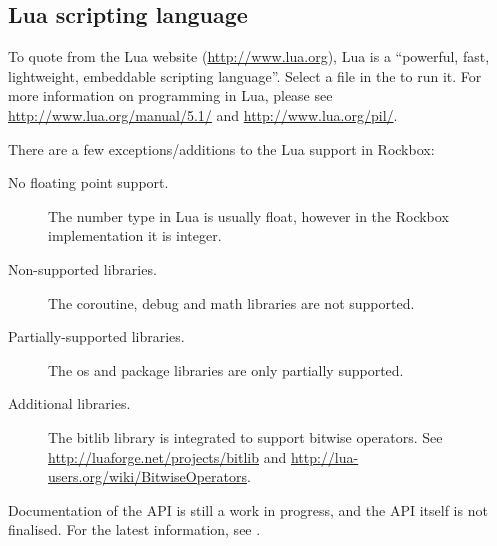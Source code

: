 \subsection{Lua scripting language}



To quote from the Lua website (\url{http://www.lua.org}), Lua is a ``powerful,
fast, lightweight, embeddable scripting language''. Select a  file
in the  to run it. For more information on programming
in Lua, please see \url{http://www.lua.org/manual/5.1/} and
\url{http://www.lua.org/pil/}.

There are a few exceptions/additions to the Lua support in Rockbox:
\begin{description}
    \item[No floating point support.] The number type in Lua is usually float,
    however in the Rockbox implementation it is integer.
    \item[Non-supported libraries.] The coroutine, debug and math libraries are
    not supported.
    \item[Partially-supported libraries.]  The os and package libraries are only
    partially supported.
    \item[Additional libraries.] The bitlib library is integrated to support
    bitwise operators.  See \url{http://luaforge.net/projects/bitlib} and
    \url{http://lua-users.org/wiki/BitwiseOperators}.
\end{description}

Documentation of the API is still a work in progress, and the API itself is
not finalised. For the latest information, see .\\

